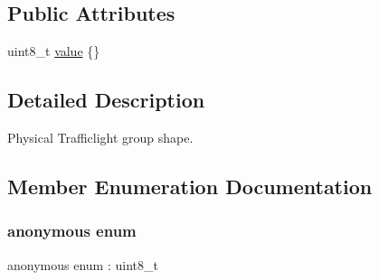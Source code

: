 \subsection*{Public Attributes}
\begin{DoxyCompactItemize}
\item 
uint8\+\_\+t \hyperlink{structmaf__perception__interface_1_1TrafficLightGroupShapeEnum_a0cbb18f21969980f179e78a69692d1b3}{value} \{\}
\end{DoxyCompactItemize}


\subsection{Detailed Description}
Physical Trafficlight group shape. 

\subsection{Member Enumeration Documentation}
\mbox{\label{structmaf__perception__interface_1_1TrafficLightGroupShapeEnum_aeb070cbaf7d247f26f5b0ae16a359380}} 
\subsubsection{\texorpdfstring{anonymous enum}{anonymous enum}}
{\footnotesize\ttfamily anonymous enum \+: uint8\+\_\+t}


